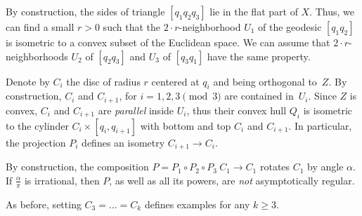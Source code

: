 \documentclass[a4paper,10pt]{article}
\begin{document}
By construction, the sides of triangle $[q_1q_2q_3]$ lie in the flat part of $X$.
Thus, we can find a small $r>0$ such that the $2\cdot r$-neighborhood $U_1$ of the geodesic $[q_1q_2]$ is isometric to a convex subset of the Euclidean space.
We can assume that $2\cdot r$-neighborhoods $U_2$ of $[q_2q_3]$ and $U_3$ of $[q_3q_1]$ have the same property.

Denote by $C_i$ the disc of radius $r$ centered at $q_i$ and being orthogonal to~$Z$.
By construction, $C_i$ and $C_{i+1}$, for $i=1,2,3\pmod 3$   are contained in~$U_i$.
Since $Z$ is convex, $C_i$ and $C_{i+1}$ are \emph{parallel} inside $U_i$, thus their convex hull  $Q_i$ is isometric to the  cylinder $C_i \times [q_i,q_{i+1}]$ with bottom and top $C_i$ and $C_{i+1}$.
In particular, the projection $P_i$ defines an isometry $C_{i+1}\to C_{i}$.

By construction, the composition $P=P_1\circ P_2\circ P_3\:C_1\to C_1$ rotates $C_1$ by angle $\alpha$.
If $\tfrac\alpha\pi$ is irrational, then $P$, as well as all its powers, are \emph{not} asymptotically regular.

As before, setting $C_3=\dots=C_k$ defines examples for any $k\geq 3$.
\qeds


{\sloppy
\printbibliography[heading=bibintoc]
\fussy
}
\end{document}

